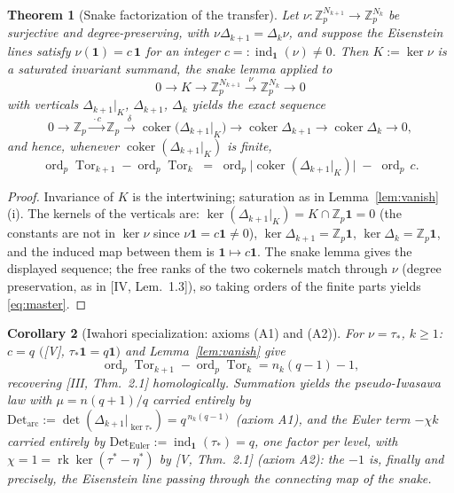 \documentclass[11pt]{amsart}
\numberwithin{equation}{section}
\newtheorem{theorem}{Theorem}[section]
\newtheorem{corollary}[theorem]{Corollary}
\theoremstyle{definition}
\theoremstyle{remark}
\newcommand{\Z}{\mathbb{Z}}
\newcommand{\Zp}{\Z_p}
\newcommand{\Tor}{\operatorname{Tor}}
\newcommand{\coker}{\operatorname{coker}}
\newcommand{\ord}{\operatorname{ord}}
\newcommand{\rk}{\operatorname{rk}}
\newcommand{\ind}{\operatorname{ind}_{\mathbf1}}
\newcommand{\ta}{\tau_*}
\begin{document}
\begin{theorem}[Snake factorization of the transfer]\label{thm:snake}
Let $\nu\colon\Zp^{N_{k+1}}\to\Zp^{N_k}$ be surjective and degree-preserving, with
$\nu\Delta_{k+1}=\Delta_k\nu$, and suppose the Eisenstein lines satisfy
$\nu(\mathbf1)=c\,\mathbf1$ for an integer $c=:\ind(\nu)\neq0$. Then $K:=\ker\nu$ is
a saturated invariant summand, the snake lemma applied to
\[
0\longrightarrow K\longrightarrow \Zp^{N_{k+1}}
\xrightarrow{\ \nu\ }\Zp^{N_k}\longrightarrow0
\]
with verticals $\Delta_{k+1}|_K$, $\Delta_{k+1}$, $\Delta_k$ yields the exact
sequence
\[
0\to\Zp\xrightarrow{\ \cdot c\ }\Zp\xrightarrow{\ \delta\ }
\coker\bigl(\Delta_{k+1}|_K\bigr)\to\coker\Delta_{k+1}\to\coker\Delta_k\to0 ,
\]
and hence, whenever $\coker(\Delta_{k+1}|_K)$ is finite,
\begin{equation}\label{eq:master}
\ord_p\Tor_{k+1}-\ord_p\Tor_k
\;=\;\ord_p\bigl|\coker(\Delta_{k+1}|_{K})\bigr|\;-\;\ord_p\,c .
\end{equation}
\end{theorem}

\begin{proof}
Invariance of $K$ is the intertwining; saturation as in
Lemma~\ref{lem:vanish}(i). The kernels of the verticals are:
$\ker(\Delta_{k+1}|_K)=K\cap\Zp\mathbf1=0$ (the constants are not in $\ker\nu$
since $\nu\mathbf1=c\mathbf1\neq0$), $\ker\Delta_{k+1}=\Zp\mathbf1$,
$\ker\Delta_k=\Zp\mathbf1$, and the induced map between them is
$\mathbf1\mapsto c\mathbf1$. The snake lemma gives the displayed sequence; the free
ranks of the two cokernels match through $\nu$ (degree preservation, as in
[IV, Lem.~1.3]), so taking orders of the finite parts yields \eqref{eq:master}.
\end{proof}

\begin{corollary}[Iwahori specialization: axioms (A1) and (A2)]\label{cor:iwahori}
For $\nu=\ta$, $k\ge1$: $c=q$ $($[V], $\ta\mathbf1=q\mathbf1)$ and
Lemma~\ref{lem:vanish} give
\[
\ord_p\Tor_{k+1}-\ord_p\Tor_k=n_k(q-1)-1 ,
\]
recovering {\rm[III, Thm.~2.1]} homologically. Summation yields the pseudo-Iwasawa
law with $\mu=n(q+1)/q$ carried entirely by
$\mathrm{Det_{arc}}:=\det(\Delta_{k+1}|_{\ker\ta})=q^{\,n_k(q-1)}$ (axiom A1), and
the Euler term $-\chi k$ carried entirely by
$\mathrm{Det_{Euler}}:=\ind(\ta)=q$, one factor per level, with
$\chi=1=\rk\ker(\tau^*-\eta^*)$ by {\rm[V, Thm.~2.1]} (axiom A2): the $-1$ is,
finally and precisely, the Eisenstein line passing through the connecting map of the
snake.
\end{corollary}
\end{document}
